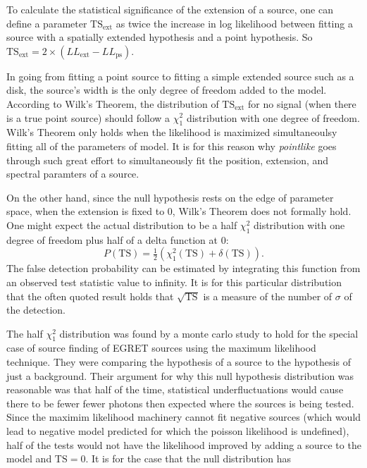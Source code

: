 \documentclass[preprint]{aastex}
\newcommand{\tsext}{\ensuremath{\text{TS}_\text{ext}}}
\newcommand{\ts}{\text{TS}}
\newcommand{\pointlike}{{\em pointlike}}
\begin{document}
To calculate the statistical significance of the extension of a source,
one can define a parameter $\tsext$ as twice the increase
in log likelihood between fitting a source with a
spatially extended hypothesis and a point hypothesis. 
So $\tsext=2\times(LL_\text{ext}-LL_\text{ps})$.

In going from fitting a point source to fitting a simple extended source such as
a disk, the source's width is the only degree of freedom added to the model. According to
Wilk's Theorem, the distribution of $\tsext$ for no signal (when there is a true
point source) should follow a $\chi^2_1$ distribution with one degree of freedom\cite{Wilks_Theorem}.
Wilk's Theorem only holds when the likelihood is maximized simultaneoulsy
fitting all of the parameters of model. It is for this reason why 
\pointlike
goes through such great effort to simultaneously fit the position, extension,
and spectral paramters of a source.

On the other hand, since the null hypothesis rests on the edge of
parameter space, when the extension is fixed to 0, Wilk's Theorem does
not formally hold\cite{Warnings about Wilk's Theorem Paper}.  One might
expect the actual distribution to be a half $\chi^2_1$ distribution with
one degree of freedom plus half of a delta function at 0:
\begin{equation}
  P(\ts)=\tfrac{1}{2}(\chi^2_1(\text{TS})+\delta(\text{TS})).
\end{equation}
The false detection probability can be estimated by integrating this function 
from an observed test statistic value to infinity. It is for this
particular distribution that the often quoted result holds that
$\sqrt{\ts}$ is a measure of the number of $\sigma$ of the detection.

The half $\chi^2_1$ distribution was found by a monte carlo study
to hold for the special case of source finding of EGRET sources using the
maximum likelihood technique.  They were comparing the hypothesis of a
source to the hypothesis of just a background\cite{Mattox_et_All_Paper}.
Their argument for why this null hypothesis distribution was reasonable
was that half of the time, statistical underfluctuations would cause
there to be fewer fewer photons then expected where the sources is being
tested. Since the maximim likelihood machinery cannot fit negative
sources (which would lead to negative model predicted for which the
poisson likelihood is undefined), half of the tests would not have the
likelihood improved by adding a source to the model and $\ts=0$.
It is for the case that the null distribution has 
\end{document}
